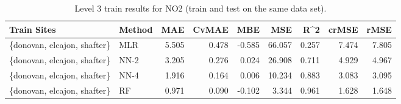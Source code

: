 \begin{table}[h]
\begin{tabular}{llrrrrrrr}
\toprule
 Train Sites & Method &   MAE &  CvMAE &       MBE &     MSE &   R\textasciicircum2 &  crMSE &   rMSE \\
\midrule
\{donovan, elcajon, shafter\} & MLR & 5.505 & 0.478 & -0.585 & 66.057 & 0.257 & 7.474 & 7.805\\
\{donovan, elcajon, shafter\} & NN-2 & 3.205 & 0.276 & 0.024 & 26.908 & 0.711 & 4.929 & 4.967\\
\{donovan, elcajon, shafter\} & NN-4 & 1.916 & 0.164 & 0.006 & 10.234 & 0.883 & 3.083 & 3.095\\
\{donovan, elcajon, shafter\} & RF & 0.971 & 0.090 & -0.102 & 3.344 & 0.961 & 1.628 & 1.648\\
\bottomrule
\end{tabular}
\caption{Level 3 train results for NO2 (train and test on the same data set).}
\end{table}
